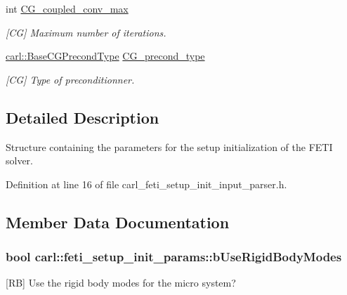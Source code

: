 \begin{DoxyCompactItemize}
int \hyperlink{structcarl_1_1feti__setup__init__params_ae4c09e7d30917128caaf61289134ea72}{C\+G\+\_\+coupled\+\_\+conv\+\_\+max}
\begin{DoxyCompactList}\small\item\em \mbox{[}C\+G\mbox{]} Maximum number of iterations. \end{DoxyCompactList}\item 
\hyperlink{namespacecarl_ad52f21755b51ffa926038b59ae194ea8}{carl\+::\+Base\+C\+G\+Precond\+Type} \hyperlink{structcarl_1_1feti__setup__init__params_a118e1fe1c87a75663fb50c4545524cb8}{C\+G\+\_\+precond\+\_\+type}
\begin{DoxyCompactList}\small\item\em \mbox{[}C\+G\mbox{]} Type of preconditionner. \end{DoxyCompactList}\end{DoxyCompactItemize}


\subsection{Detailed Description}
Structure containing the parameters for the setup initialization of the F\+E\+T\+I solver. 

Definition at line 16 of file carl\+\_\+feti\+\_\+setup\+\_\+init\+\_\+input\+\_\+parser.\+h.



\subsection{Member Data Documentation}
\hypertarget{structcarl_1_1feti__setup__init__params_af4191df4632d21bed2b302c08d113d14}{}
\subsubsection[{b\+Use\+Rigid\+Body\+Modes}]{\setlength{\rightskip}{0pt plus 5cm}bool carl\+::feti\+\_\+setup\+\_\+init\+\_\+params\+::b\+Use\+Rigid\+Body\+Modes}\label{structcarl_1_1feti__setup__init__params_af4191df4632d21bed2b302c08d113d14}


\mbox{[}R\+B\mbox{]} Use the rigid body modes for the micro system? 



